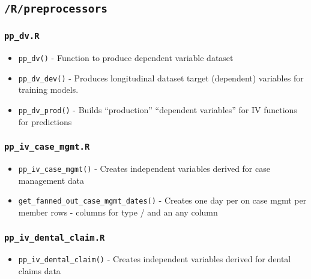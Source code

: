 \documentclass[
]{book}
\providecommand{\tightlist}{%
  \setlength{\itemsep}{0pt}\setlength{\parskip}{0pt}}
\begin{document}
\hypertarget{rpreprocessors}{%
\subsection{\texorpdfstring{\texttt{/R/preprocessors}}{/R/preprocessors}}\label{rpreprocessors}}

\hypertarget{pp_dv.r}{%
\subsubsection{\texorpdfstring{\texttt{pp\_dv.R}}{pp\_dv.R}}\label{pp_dv.r}}

\begin{itemize}
\tightlist
\item
  \texttt{pp\_dv()} - Function to produce dependent variable dataset
\item
  \texttt{pp\_dv\_dev()} - Produces longitudinal dataset target (dependent) variables for training models.
\item
  \texttt{pp\_dv\_prod()} - Builds ``production'' ``dependent variables'' for IV functions for predictions
\end{itemize}

\hypertarget{pp_iv_case_mgmt.r}{%
\subsubsection{\texorpdfstring{\texttt{pp\_iv\_case\_mgmt.R}}{pp\_iv\_case\_mgmt.R}}\label{pp_iv_case_mgmt.r}}

\begin{itemize}
\tightlist
\item
  \texttt{pp\_iv\_case\_mgmt()} - Creates independent variables derived for case management data
\item
  \texttt{get\_fanned\_out\_case\_mgmt\_dates()} - Creates one day per on case mgmt per member rows - columns for type / and an any column
\end{itemize}

\hypertarget{pp_iv_dental_claim.r}{%
\subsubsection{\texorpdfstring{\texttt{pp\_iv\_dental\_claim.R}}{pp\_iv\_dental\_claim.R}}\label{pp_iv_dental_claim.r}}

\begin{itemize}
\tightlist
\item
  \texttt{pp\_iv\_dental\_claim()} - Creates independent variables derived for dental claims data
\end{itemize}
\end{document}
